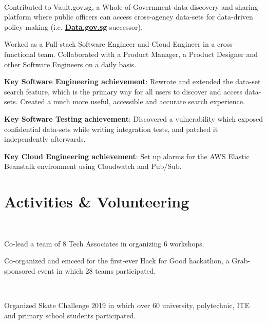 \documentclass[a4paper]{resume-template} %
\begin{document}
\begin{minipage}[t]{0.60\textwidth}
\\
\begin{tightemize}
\item Contributed to Vault.gov.sg, a Whole-of-Government data discovery and sharing platform where public officers can access cross-agency data-sets for data-driven policy-making (i.e. {\bf \href{https://data.gov.sg/}{Data.gov.sg}} successor).
\item Worked as a Full-stack Software Engineer and Cloud Engineer in a cross-functional team. Collaborated with a Product Manager, a Product Designer and other Software Engineers on a daily basis.
\item {\fontsize{10}{10}\selectfont\bfseries Key Software Engineering achievement}: Rewrote and extended the data-set search feature, which is the primary way for all users to discover and access data-sets. Created a much more useful, accessible and accurate search experience.
\item {\fontsize{10}{10}\selectfont\bfseries Key Software Testing achievement}: Discovered a vulnerability which exposed confidential data-sets while writing integration tests, and patched it independently afterwards.
\item {\fontsize{10}{10}\selectfont\bfseries Key Cloud Engineering achievement}: Set up alarms for the AWS Elastic Beanstalk environment using Cloudwatch and Pub/Sub.
\end{tightemize}
\sectionsep


\section{Activities \& Volunteering}
\\
\begin{tightemize}
\item Co-lead a team of 8 Tech Associates in organizing 6 workshops.
\item Co-organized and emceed for the first-ever Hack for Good hackathon, a Grab-sponsored event in which 28 teams participated.
\end{tightemize}
\sectionsep

\\
\begin{tightemize}
\item Organized Skate Challenge 2019 in which over 60 university, polytechnic, ITE and primary school students participated.
\end{tightemize}
\sectionsep


\end{minipage}
\end{document}
